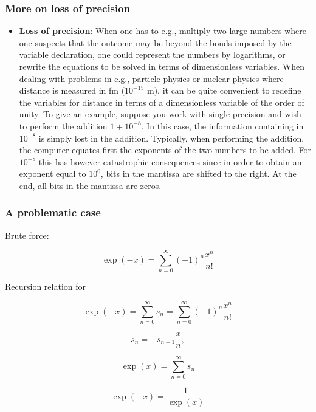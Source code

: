 \documentclass{beamer}
\newenvironment{block_mdfboxadmon}[1][]{\begin{block}{#1}}{\end{block}}
\begin{document}
\begin{frame}
\frametitle{More on loss of precision}

\begin{block_mdfboxadmon}

\begin{itemize}
  \item \textbf{Loss of precision}: When one has to e.g., multiply two large numbers where one suspects that the outcome may be beyond the bonds imposed by the variable declaration, one could represent the numbers by logarithms, or rewrite the equations to be solved in terms of dimensionless variables. When dealing with problems in e.g., particle physics or nuclear physics where distance is measured in fm ($10^{-15}$ m), it can be quite convenient to redefine the variables for distance in terms of a dimensionless variable of the order of unity. To give an example, suppose you work with single precision and wish to perform the addition $1+10^{-8}$. In this case, the information containing in $10^{-8}$ is simply lost in the addition. Typically, when performing the addition, the computer equates first the exponents of the two numbers to be added. For $10^{-8}$ this has however catastrophic consequences since in order to obtain an exponent equal to $10^0$, bits in the mantissa are shifted to the right. At the end, all bits in the mantissa are zeros.
\end{itemize}

\noindent
\end{block_mdfboxadmon}
\end{frame}

\begin{frame}
\frametitle{A problematic case}

\begin{block_mdfboxadmon}
Brute force:

\[\exp{(-x)}=\sum_{n=0}^{\infty}(-1)^n\frac{x^n}{n!}\]

Recursion relation for

\[ \exp{(-x)}=\sum_{n=0}^{\infty}s_n=\sum_{n=0}^{\infty}(-1)^n\frac{x^n}{n!} \]

\[ s_n=-s_{n-1}\frac{x}{n}, \]

\[ \exp{(x)}=\sum_{n=0}^{\infty}s_n \]

\[ \exp{(-x)}=\frac{1}{\exp{(x)}} \]
\end{block_mdfboxadmon}
\end{frame}
\end{document}
